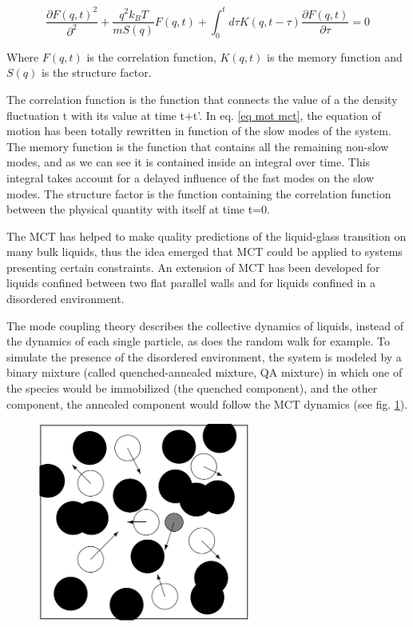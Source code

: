 \documentclass[a4paper,12pt]{article}
\newcommand{\jline}{\vspace{10pt}}
\begin{document}
\begin{equation}
\label{eq mot mct}
\frac{\partial F(q,t)^2}{\partial^2}+\frac{q^2k_BT}{mS(q)}F(q,t)+\int_0^t d\tau K(q,t-\tau) \frac{\partial F(q,t)}{\partial \tau}=0
\end{equation}

Where $F(q,t)$ is the correlation function, $K(q,t)$ is the memory function and $S(q)$ is the structure factor.\jline

The correlation function is the function that connects the value of a the density fluctuation t with its value at time t+t'.
In eq. \ref{eq mot mct}, the equation of motion has been totally rewritten in function of the slow modes of the system. The memory function
is the function that contains all the remaining non-slow modes, and as we can see it is contained inside an integral over time. This 
integral takes account for a delayed influence of the fast modes on the slow modes. The structure factor is the function containing the 
correlation function between the physical quantity with itself at time t=0.\jline

The MCT has helped to make quality predictions of the liquid-glass transition on many bulk liquids, thus the idea emerged that MCT could
be applied to systems presenting certain constraints. An extension of MCT has been developed for liquids confined between two flat parallel
walls \cite{Lang2012} and for liquids confined in a disordered environment.\jline

The mode coupling theory describes the collective dynamics of liquids, instead of the dynamics of each single particle, as does the random
walk for example. To simulate the presence of the disordered environment, the system is modeled by a binary mixture (called quenched-annealed
mixture, QA mixture) in which one of the species would be immobilized (the quenched component), and the other component, the annealed 
component would follow the MCT dynamics (see fig. \ref{qa mixture}).

\begin{figure}[htbp]
\centering
\subfigure
{\includegraphics[width=7cm]{pics/qa_mixtures.png}}
\caption{}
\label{qa mixture}
\end{figure}

\newpage


\end{document}
